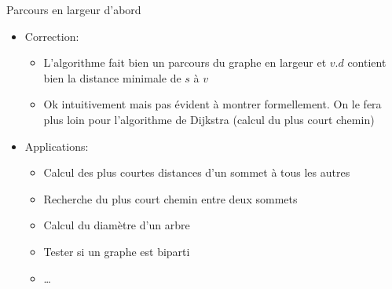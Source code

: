 \begin{frame}{Parcours en largeur d'abord}

\begin{itemize}
\item Correction:
\begin{itemize}
\item L'algorithme fait bien un parcours du graphe en largeur et $v.d$ contient bien la distance minimale de $s$ à $v$
\item Ok intuitivement mais pas évident à montrer formellement. On le
  fera plus loin pour l'algorithme de Dijkstra (calcul du plus court
  chemin)
\end{itemize}

\bigskip

\item Applications:
\begin{itemize}
\item Calcul des plus courtes distances d'un sommet à tous les autres
\item Recherche du plus court chemin entre deux sommets
\item Calcul du diamètre d'un arbre
\item Tester si un graphe est biparti
\item \ldots
\end{itemize}
\end{itemize}
\end{frame}


